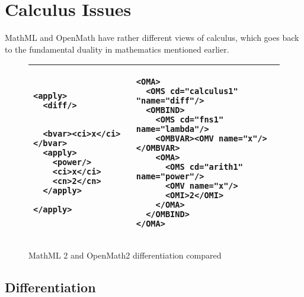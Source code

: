 \documentclass{llncs}
\begin{document}
\section{Calculus Issues}
MathML and OpenMath have rather different views of calculus, which goes back
to the fundamental duality in mathematics mentioned earlier. 

\begin{figure}\lstset{frame=none,numbers=none}\centering
\lstset{aboveskip=-.7em,belowskip=-1.2em}
\begin{tabular}{|p{4.5cm}|p{7cm}|}\hline
\begin{lstlisting}[language=MathML2]
<apply>
  <diff/>
         
         
  <bvar><ci>x</ci></bvar>
  <apply>                
    <power/>             
    <ci>x</ci>           
    <cn>2</cn>           
  </apply>               
                         
</apply>                 
\end{lstlisting}&
\begin{lstlisting}
<OMA>
  <OMS cd="calculus1" "name="diff"/>
  <OMBIND>
    <OMS cd="fns1" name="lambda"/>
    <OMBVAR><OMV name="x"/></OMBVAR>
    <OMA>
      <OMS cd="arith1" name="power"/>
      <OMV name="x"/>
      <OMI>2</OMI>
    </OMA>
  </OMBIND>
</OMA>
\end{lstlisting}\\\hline
\end{tabular}
\caption{MathML 2 and OpenMath2 differentiation compared}\label{lst:deriv}
\end{figure}

\iffull\subsection{Differentiation}\fi
\end{document}
